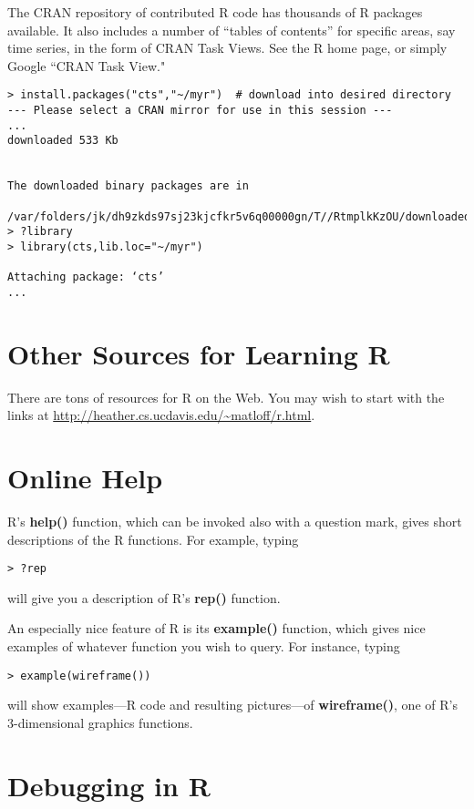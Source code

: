 The CRAN repository of contributed R code has thousands of R packages
available.  It also includes a number of ``tables of contents'' for
specific areas, say time series, in the form of CRAN Task Views.  See
the R home page, or simply Google ``CRAN Task View."

\begin{verbatim}
> install.packages("cts","~/myr")  # download into desired directory
--- Please select a CRAN mirror for use in this session ---
...
downloaded 533 Kb


The downloaded binary packages are in
        /var/folders/jk/dh9zkds97sj23kjcfkr5v6q00000gn/T//RtmplkKzOU/downloaded_packages
> ?library
> library(cts,lib.loc="~/myr")

Attaching package: ‘cts’
...
\end{verbatim}

\section{Other Sources for Learning R}

There are tons of resources for R on the Web.  You may wish to start
with the links at \url{http://heather.cs.ucdavis.edu/~matloff/r.html}.

\section{Online Help} 

R's {\bf help()} function, which can be invoked also with a
question mark, gives short descriptions of the R functions. For
example, typing

\begin{Verbatim}[fontsize=\relsize{-2}]
> ?rep
\end{Verbatim}
  
will give you a description of R's {\bf rep()} function.

An especially nice feature of R is its {\bf example()} function, which
gives nice examples of whatever function you wish to query. For
instance, typing

\begin{lstlisting}
> example(wireframe())
\end{lstlisting}
  
will show examples---R code and resulting pictures---of {\bf wireframe()},
one of R's 3-dimensional graphics functions.

\section{Debugging in R}


